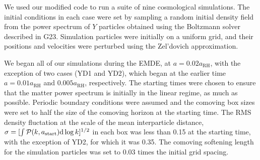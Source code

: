 \documentclass[a4paper,11pt]{article}
\newcommand{\rh}[1]{{#1}_{\mathrm{RH}}}
\newcommand{\diff}{\ensuremath{\mathrm{d}}}
\begin{document}
We used our modified code to run a suite of nine cosmological simulations. The initial conditions in each case were set by sampling a random initial density field from the power spectrum of $Y$ particles obtained using the Boltzmann solver described in G23. Simulation particles were initially on a uniform grid, and their positions and velocities were perturbed using the Zel'dovich approximation.

We began all of our simulations during the EMDE, at $a = 0.02 \rh{a}$, with the exception of two cases (YD1 and YD2), which began at the earlier time $a=0.01 \rh{a}$ and $0.005\rh{a}$, respectively. The starting times were chosen to ensure that the matter power spectrum is initially in the linear regime, as much as possible. Periodic boundary conditions were assumed and the comoving box sizes were set to half the size of the comoving horizon at the starting time. The RMS density fluctation at the scale of the mean interparticle distance, $\sigma=[\int\mathcal{P}(k,a_{\rm start})\diff\log k]^{1/2}$ in each box was less than 0.15 at the starting time, with the exception of YD2, for which it was 0.35. The comoving softening length for the simulation particles was set to 0.03 times the initial grid spacing.
\end{document}
